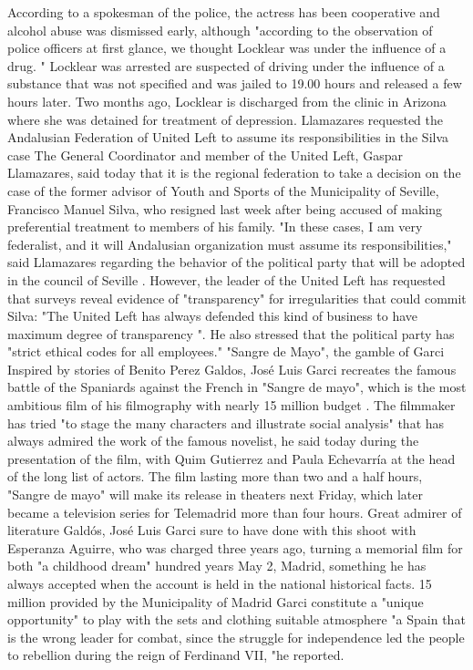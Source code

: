 According to a spokesman of the police, the actress has been cooperative and alcohol abuse was dismissed early, although "according to the observation of police officers at first glance, we thought Locklear was under the influence of a drug. "
Locklear was arrested are suspected of driving under the influence of a substance that was not specified and was jailed to 19.00 hours and released a few hours later.
Two months ago, Locklear is discharged from the clinic in Arizona where she was detained for treatment of depression.
Llamazares requested the Andalusian Federation of United Left to assume its responsibilities in the Silva case
The General Coordinator and member of the United Left, Gaspar Llamazares, said today that it is the regional federation to take a decision on the case of the former advisor of Youth and Sports of the Municipality of Seville, Francisco Manuel Silva, who resigned last week after being accused of making preferential treatment to members of his family.
"In these cases, I am very federalist, and it will Andalusian organization must assume its responsibilities," said Llamazares regarding the behavior of the political party that will be adopted in the council of Seville .
However, the leader of the United Left has requested that surveys reveal evidence of "transparency" for irregularities that could commit Silva: "The United Left has always defended this kind of business to have maximum degree of transparency ".
He also stressed that the political party has "strict ethical codes for all employees."
"Sangre de Mayo", the gamble of Garci
Inspired by stories of Benito Perez Galdos, José Luis Garci recreates the famous battle of the Spaniards against the French in "Sangre de mayo", which is the most ambitious film of his filmography with nearly 15 million budget .
The filmmaker has tried "to stage the many characters and illustrate social analysis" that has always admired the work of the famous novelist, he said today during the presentation of the film, with Quim Gutierrez and Paula Echevarría at the head of the long list of actors.
The film lasting more than two and a half hours, "Sangre de mayo" will make its release in theaters next Friday, which later became a television series for Telemadrid more than four hours.
Great admirer of literature Galdós, José Luis Garci sure to have done with this shoot with Esperanza Aguirre, who was charged three years ago, turning a memorial film for both "a childhood dream" hundred years May 2, Madrid, something he has always accepted when the account is held in the national historical facts.
15 million provided by the Municipality of Madrid Garci constitute a "unique opportunity" to play with the sets and clothing suitable atmosphere "a Spain that is the wrong leader for combat, since the struggle for independence led the people to rebellion during the reign of Ferdinand VII, "he reported.
